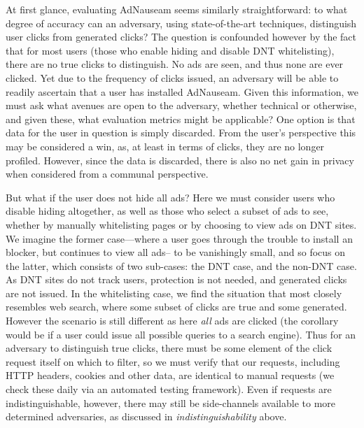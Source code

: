\documentclass[conference]{IEEEtran}
\begin{document}
At first glance, evaluating AdNauseam seems similarly straightforward: to what degree of accuracy can an adversary, using state-of-the-art techniques, distinguish user clicks from generated clicks? The question is confounded however by the fact that for most users (those who enable hiding and disable DNT whitelisting), there are no true clicks to distinguish. No ads are seen, and thus none are ever clicked. Yet due to the frequency of clicks issued, an adversary will be able to readily ascertain that a user has installed AdNauseam. Given this information, we must ask what avenues are open to the adversary, whether technical or otherwise, and given these, what evaluation metrics might be applicable? One option is that data for the user in question is simply discarded. From the user's perspective this may be considered a win, as, at least in terms of clicks, they are no longer profiled. However, since the data is discarded, there is also no net gain in privacy when considered from a communal perspective.

But what if the user does not hide all ads? Here we must consider users who disable hiding altogether, as well as those who select a subset of ads to see, whether by manually whitelisting pages or by choosing to view ads on DNT sites. We imagine the former case---where a user goes through the trouble to install an blocker, but continues to view all ads-- to be vanishingly small, and so focus on the latter, which consists of two sub-cases: the DNT case, and the non-DNT case. As DNT sites do not track users, protection is not needed, and generated clicks are not issued. In the whitelisting case, we find the situation that most closely resembles web search, where some subset of clicks are true and some generated. However the scenario is still different as here \emph{all} ads are clicked (the corollary would be if a user could issue all possible queries to a search engine). Thus for an adversary to distinguish true clicks, there must be some element of the click request itself on which to filter, so we must verify that our requests, including HTTP headers, cookies and other data, are identical to manual requests (we check these daily via an automated testing framework). Even if requests are indistinguishable, however, there may still be side-channels available to more determined adversaries, as discussed in \emph{indistinguishability} above.

\end{document}
